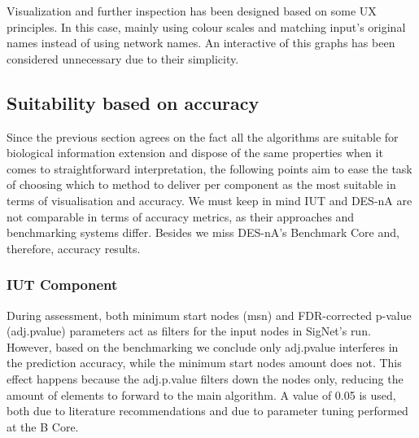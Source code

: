 Visualization and further inspection has been designed based on some UX principles. In this case, mainly using colour scales and matching input’s original names instead of using network names. An interactive of this graphs has been considered unnecessary due to their simplicity.

\subsection{Suitability based on accuracy}
Since the previous section agrees on the fact all the algorithms are suitable for biological information extension and dispose of the same properties when it comes to straightforward interpretation, the following points aim to ease the task of choosing which to method to deliver per component as the most suitable in terms of visualisation and accuracy.
We must keep in mind IUT and DES-nA are not comparable in terms of accuracy metrics, as their approaches and benchmarking systems differ. Besides we miss DES-nA’s Benchmark Core and, therefore, accuracy results.

\subsubsection{IUT Component}
During assessment, both minimum start nodes (msn) and FDR-corrected p-value (adj.pvalue) parameters act as filters for the input nodes in SigNet’s run. However, based on the benchmarking we conclude only adj.pvalue interferes in the prediction accuracy, while the minimum start nodes amount does not. This effect happens because the adj.p.value filters down the nodes only, reducing the amount of elements to forward to the main algorithm. A value of 0.05 is used, both due to literature recommendations and due to parameter tuning performed at the B Core.
\\

\begin{table}[]
\centering
{}
\end{table}

